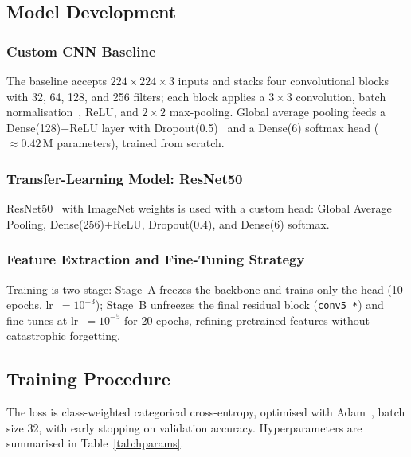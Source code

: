 \documentclass[preprint,12pt]{elsarticle}
\begin{document}
\subsection{Model Development}
\subsubsection{Custom CNN Baseline}
The baseline accepts $224\times224\times3$ inputs and stacks four convolutional
blocks with 32, 64, 128, and 256 filters; each block applies a $3\times3$
convolution, batch normalisation~\cite{ioffe2015batch}, ReLU, and $2\times2$
max-pooling.
Global average pooling feeds a Dense(128)+ReLU layer with
Dropout(0.5)~\cite{srivastava2014dropout} and a Dense(6) softmax head
($\approx0.42$\,M parameters), trained from scratch.
\subsubsection{Transfer-Learning Model: ResNet50}
ResNet50~\cite{he2016deep} with ImageNet weights is used with a custom head:
Global Average Pooling, Dense(256)+ReLU, Dropout(0.4), and Dense(6) softmax.
\subsubsection{Feature Extraction and Fine-Tuning Strategy}
Training is two-stage: Stage~A freezes the backbone and trains only the head
(10 epochs, lr~$=10^{-3}$); Stage~B unfreezes the final residual block
(\texttt{conv5\_*}) and fine-tunes at lr~$=10^{-5}$ for 20 epochs, refining
pretrained features without catastrophic forgetting.

\subsection{Training Procedure}
The loss is class-weighted categorical cross-entropy, optimised with
Adam~\cite{kingma2014adam}, batch size 32, with early stopping on validation
accuracy.
Hyperparameters are summarised in Table~\ref{tab:hparams}.
\end{document}
